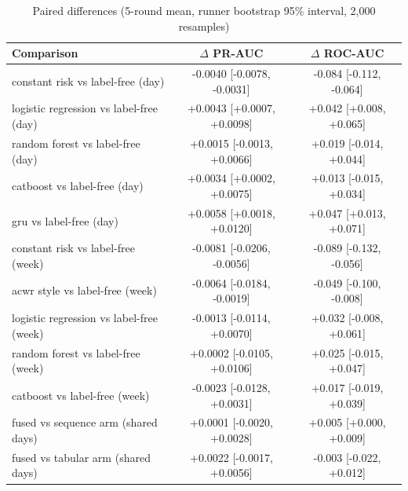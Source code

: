 \begin{table}[t]\centering\caption{Paired differences (5-round mean, runner bootstrap 95\% interval, 2,000 resamples)}\label{tab:compare}
\footnotesize\begin{tabular}{lcc}\toprule
Comparison & $\Delta$ PR-AUC & $\Delta$ ROC-AUC \\\midrule
constant risk vs label-free (day) & -0.0040 [-0.0078, -0.0031] & -0.084 [-0.112, -0.064] \\
logistic regression vs label-free (day) & +0.0043 [+0.0007, +0.0098] & +0.042 [+0.008, +0.065] \\
random forest vs label-free (day) & +0.0015 [-0.0013, +0.0066] & +0.019 [-0.014, +0.044] \\
catboost vs label-free (day) & +0.0034 [+0.0002, +0.0075] & +0.013 [-0.015, +0.034] \\
gru vs label-free (day) & +0.0058 [+0.0018, +0.0120] & +0.047 [+0.013, +0.071] \\
constant risk vs label-free (week) & -0.0081 [-0.0206, -0.0056] & -0.089 [-0.132, -0.056] \\
acwr style vs label-free (week) & -0.0064 [-0.0184, -0.0019] & -0.049 [-0.100, -0.008] \\
logistic regression vs label-free (week) & -0.0013 [-0.0114, +0.0070] & +0.032 [-0.008, +0.061] \\
random forest vs label-free (week) & +0.0002 [-0.0105, +0.0106] & +0.025 [-0.015, +0.047] \\
catboost vs label-free (week) & -0.0023 [-0.0128, +0.0031] & +0.017 [-0.019, +0.039] \\
fused vs sequence arm (shared days) & +0.0001 [-0.0020, +0.0028] & +0.005 [+0.000, +0.009] \\
fused vs tabular arm (shared days) & +0.0022 [-0.0017, +0.0056] & -0.003 [-0.022, +0.012] \\
\bottomrule\end{tabular}\end{table}
